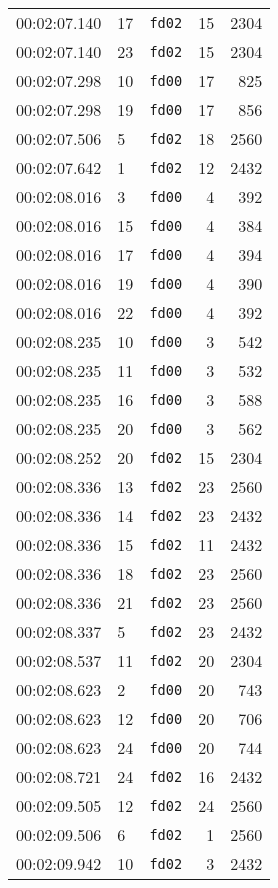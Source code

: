 \documentclass{article}
\begin{document}
\begin{longtable}{lllrr}
00:02:07.140 & 17 & \texttt{fd02} & 15 & 2304 \\
00:02:07.140 & 23 & \texttt{fd02} & 15 & 2304 \\
00:02:07.298 & 10 & \texttt{fd00} & 17 & 825 \\
00:02:07.298 & 19 & \texttt{fd00} & 17 & 856 \\
00:02:07.506 & 5 & \texttt{fd02} & 18 & 2560 \\
00:02:07.642 & 1 & \texttt{fd02} & 12 & 2432 \\
00:02:08.016 & 3 & \texttt{fd00} & 4 & 392 \\
00:02:08.016 & 15 & \texttt{fd00} & 4 & 384 \\
00:02:08.016 & 17 & \texttt{fd00} & 4 & 394 \\
00:02:08.016 & 19 & \texttt{fd00} & 4 & 390 \\
00:02:08.016 & 22 & \texttt{fd00} & 4 & 392 \\
00:02:08.235 & 10 & \texttt{fd00} & 3 & 542 \\
00:02:08.235 & 11 & \texttt{fd00} & 3 & 532 \\
00:02:08.235 & 16 & \texttt{fd00} & 3 & 588 \\
00:02:08.235 & 20 & \texttt{fd00} & 3 & 562 \\
00:02:08.252 & 20 & \texttt{fd02} & 15 & 2304 \\
00:02:08.336 & 13 & \texttt{fd02} & 23 & 2560 \\
00:02:08.336 & 14 & \texttt{fd02} & 23 & 2432 \\
00:02:08.336 & 15 & \texttt{fd02} & 11 & 2432 \\
00:02:08.336 & 18 & \texttt{fd02} & 23 & 2560 \\
00:02:08.336 & 21 & \texttt{fd02} & 23 & 2560 \\
00:02:08.337 & 5 & \texttt{fd02} & 23 & 2432 \\
00:02:08.537 & 11 & \texttt{fd02} & 20 & 2304 \\
00:02:08.623 & 2 & \texttt{fd00} & 20 & 743 \\
00:02:08.623 & 12 & \texttt{fd00} & 20 & 706 \\
00:02:08.623 & 24 & \texttt{fd00} & 20 & 744 \\
00:02:08.721 & 24 & \texttt{fd02} & 16 & 2432 \\
00:02:09.505 & 12 & \texttt{fd02} & 24 & 2560 \\
00:02:09.506 & 6 & \texttt{fd02} & 1 & 2560 \\
00:02:09.942 & 10 & \texttt{fd02} & 3 & 2432 \\

\end{longtable}
\end{document}
